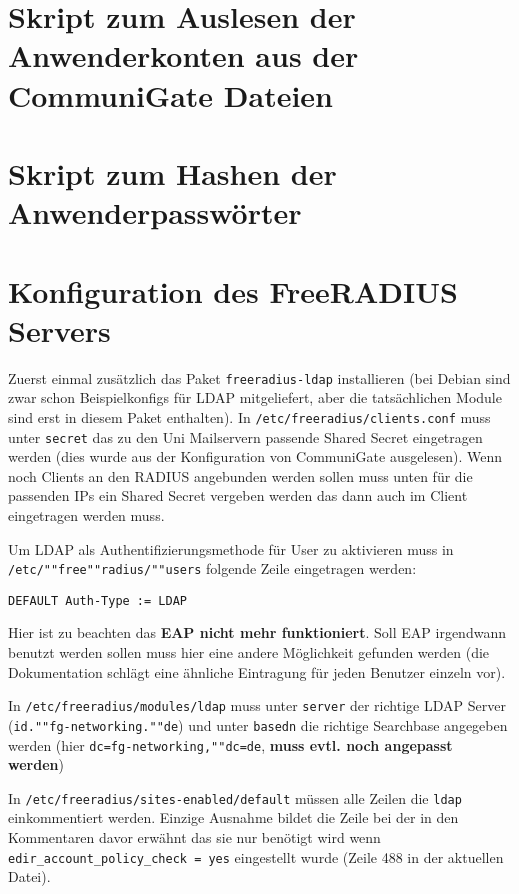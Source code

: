 \documentclass[11pt,a4paper,titlepage=firstiscover,headsepline]{scrartcl} %
\begin{document}
\newpage
\section{Skript zum Auslesen der Anwenderkonten aus der CommuniGate Dateien}\label{sec:SkriptA}


\newpage
\section{Skript zum Hashen der Anwenderpasswörter}\label{sec:SkriptB}


\newpage
\section{Konfiguration des FreeRADIUS Servers}\label{sec:RADIUS-Konfig}
Zuerst einmal zusätzlich das Paket \texttt{freeradius-ldap} installieren (bei Debian sind zwar schon Beispielkonfigs für LDAP mitgeliefert, aber die tatsächlichen Module sind erst in diesem Paket enthalten). In \texttt{/etc/freeradius/clients.conf} muss unter \texttt{secret} das zu den Uni Mailservern passende Shared Secret eingetragen werden (dies wurde aus der Konfiguration von CommuniGate ausgelesen). Wenn noch Clients an den RADIUS angebunden werden sollen muss unten für die passenden IPs ein Shared Secret vergeben werden das dann auch im Client eingetragen werden muss.

Um LDAP als Authentifizierungsmethode für User zu aktivieren muss in \texttt{/etc/""free""radius/""users} folgende Zeile eingetragen werden:
\begin{lstlisting}
DEFAULT Auth-Type := LDAP
\end{lstlisting}
Hier ist zu beachten das \textbf{EAP nicht mehr funktioniert}. Soll EAP irgendwann benutzt werden sollen muss hier eine andere Möglichkeit gefunden werden (die Dokumentation schlägt eine ähnliche Eintragung für jeden Benutzer einzeln vor).

In \texttt{/etc/freeradius/modules/ldap} muss unter \texttt{server} der richtige LDAP Server (\texttt{id.""fg-networking.""de}) und unter \texttt{basedn} die richtige Searchbase angegeben werden (hier \texttt{dc=fg-networking,""dc=de}, \textbf{muss evtl. noch angepasst werden})

In \texttt{/etc/freeradius/sites-enabled/default} müssen alle Zeilen die \texttt{ldap} einkommentiert werden. Einzige Ausnahme bildet die Zeile bei der in den Kommentaren davor erwähnt das sie nur benötigt wird wenn \texttt{edir\_account\_policy\_check = yes} eingestellt wurde (Zeile 488 in der aktuellen Datei).
\end{document}
